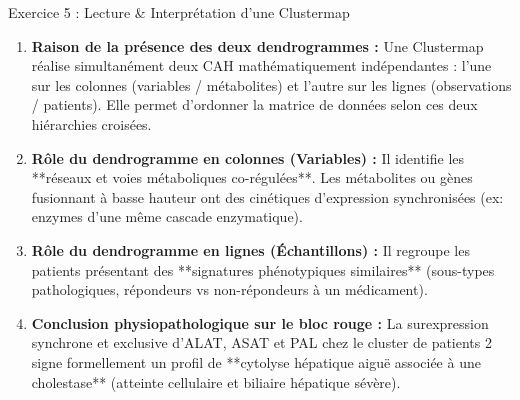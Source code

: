 \documentclass[11pt,a4paper]{article}
\begin{document}
\begin{solutionbox}{Exercice 5 : Lecture \& Interprétation d'une Clustermap}
\begin{enumerate}[label=\textbf{\alph*.}]
  \item \textbf{Raison de la présence des deux dendrogrammes :}
  Une Clustermap réalise simultanément deux CAH mathématiquement indépendantes : l'une sur les colonnes (variables / métabolites) et l'autre sur les lignes (observations / patients). Elle permet d'ordonner la matrice de données selon ces deux hiérarchies croisées.

  \item \textbf{Rôle du dendrogramme en colonnes (Variables) :}
  Il identifie les **réseaux et voies métaboliques co-régulées**. Les métabolites ou gènes fusionnant à basse hauteur ont des cinétiques d'expression synchronisées (ex: enzymes d'une même cascade enzymatique).

  \item \textbf{Rôle du dendrogramme en lignes (Échantillons) :}
  Il regroupe les patients présentant des **signatures phénotypiques similaires** (sous-types pathologiques, répondeurs vs non-répondeurs à un médicament).

  \item \textbf{Conclusion physiopathologique sur le bloc rouge :}
  La surexpression synchrone et exclusive d'ALAT, ASAT et PAL chez le cluster de patients 2 signe formellement un profil de **cytolyse hépatique aiguë associée à une cholestase** (atteinte cellulaire et biliaire hépatique sévère).
\end{enumerate}
\end{solutionbox}
\end{document}
